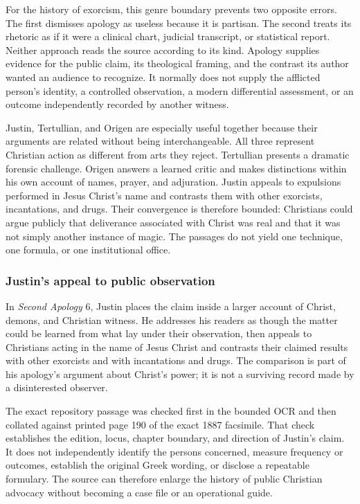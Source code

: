 For the history of exorcism, this genre boundary prevents two opposite errors.
The first dismisses apology as useless because it is partisan. The second
treats its rhetoric as if it were a clinical chart, judicial transcript, or
statistical report. Neither approach reads the source according to its kind.
Apology supplies evidence for the public claim, its theological framing, and
the contrast its author wanted an audience to recognize. It normally does not
supply the afflicted person's identity, a controlled observation, a modern
differential assessment, or an outcome independently recorded by another
witness.

Justin, Tertullian, and Origen are especially useful together because their
arguments are related without being interchangeable. All three represent
Christian action as
different from arts they reject. Tertullian presents a dramatic forensic
challenge. Origen answers a learned critic and makes distinctions within his
own account of names, prayer, and adjuration. Justin appeals to expulsions
performed in Jesus Christ's name and contrasts them with other exorcists,
incantations, and drugs. Their convergence is therefore
bounded: Christians could argue publicly that deliverance associated with
Christ was real and that it was not simply another instance of magic. The
passages do not yield one technique, one formula, or one institutional office.

\subsubsection{Justin's appeal to public observation}

In \emph{Second Apology} 6, Justin places the claim inside a larger account of
Christ, demons, and Christian witness. He addresses his readers as though the
matter could be learned from what lay under their observation, then appeals to
Christians acting in the name of Jesus Christ and contrasts their claimed
results with other exorcists and with incantations and drugs. The comparison is
part of his apology's argument about Christ's power; it is not a surviving
record made by a disinterested observer.

The exact repository passage was checked first in the bounded OCR and then
collated against printed page 190 of the exact 1887 facsimile. That check
establishes the edition, locus, chapter boundary, and direction of Justin's
claim. It does not independently identify the persons concerned, measure
frequency or outcomes, establish the original Greek wording, or disclose a
repeatable formulary. The source can therefore enlarge the history of public
Christian advocacy without becoming a case file or an operational guide.

